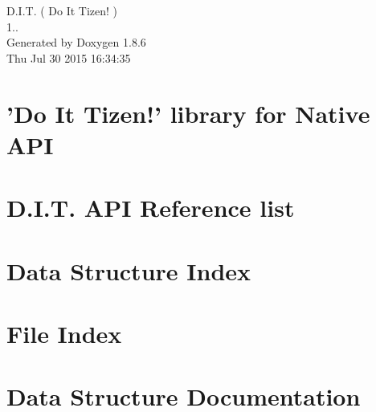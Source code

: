 \documentclass[twoside]{book}
\newcommand{\clearemptydoublepage}{%
  \newpage{\pagestyle{empty}\cleardoublepage}%
}
\begin{document}
\begin{titlepage}
\vspace*{7cm}
\begin{center}%
{\Large D.\-I.\-T. ( Do It Tizen! ) \\[1ex]\large 1.. }\\
\vspace*{1cm}
{\large Generated by Doxygen 1.8.6}\\
\vspace*{0.5cm}
{\small Thu Jul 30 2015 16:34:35}\\
\end{center}
\end{titlepage}
\clearemptydoublepage
\tableofcontents
\clearemptydoublepage
{}

\chapter{'Do It Tizen!' library for Native A\-P\-I}
\label{index}
\chapter{D.\-I.\-T. A\-P\-I Reference list}
\label{md__Users_CDJ_Dropbox_DJ_SSM_DIT_doxygen_DIT_API_Reference_list}

\chapter{Data Structure Index}

\chapter{File Index}

\chapter{Data Structure Documentation}































\end{document}
